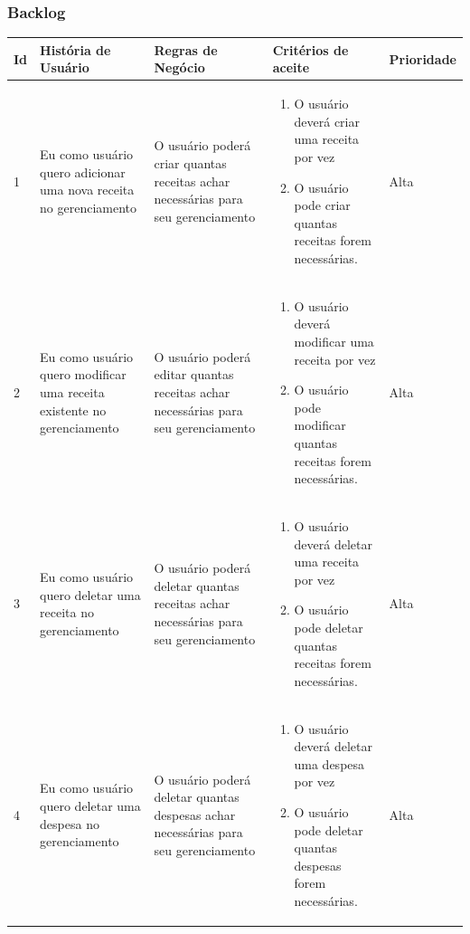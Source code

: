 \subsubsection{Backlog}
\newpage
\begin{longtable}[h!]{ | M{0.5cm} | T{2.7cm} | T{2.7cm} | T{4cm} | l | } \hline

    \textbf{Id} & \textbf{História de Usuário} &\textbf{Regras de Negócio} & \textbf{Critérios de aceite} & \textbf{Prioridade} \\ [5pt] \hline

    1 & Eu como usuário quero adicionar uma nova receita no gerenciamento &O usuário poderá criar quantas receitas achar necessárias para seu gerenciamento & \begin{enumerate}
        \item O usuário deverá criar uma receita por vez
        \item O usuário pode criar quantas receitas forem necessárias.
    \end{enumerate} & Alta \\ \hline


    2 & Eu como usuário quero modificar uma receita existente no gerenciamento & O usuário poderá editar quantas receitas achar necessárias para seu gerenciamento & \begin{enumerate}
        \item O usuário deverá modificar uma receita por vez
        \item O usuário pode modificar quantas receitas forem necessárias.
    \end{enumerate} & Alta \\ \hline


    3 & Eu como usuário quero deletar uma receita no gerenciamento & O usuário poderá deletar quantas receitas achar necessárias para seu gerenciamento & \begin{enumerate}
        \item O usuário deverá deletar uma receita por vez
        \item O usuário pode deletar quantas receitas forem necessárias.
    \end{enumerate} & Alta \\ \hline

    4 & Eu como usuário quero deletar uma despesa no gerenciamento & O usuário poderá deletar quantas despesas achar necessárias para seu gerenciamento & \begin{enumerate}
        \item O usuário deverá deletar uma despesa por vez
        \item O usuário pode deletar quantas despesas forem necessárias.
    \end{enumerate} & Alta \\ \hline


\end{longtable}
